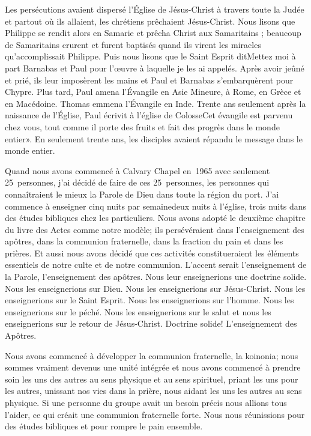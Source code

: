Les persécutions avaient dispersé l’Église de Jésus-Christ à travers toute la Judée et partout où ils allaient, les
chrétiens prêchaient Jésus-Christ. Nous lisons que Philippe se rendit alors en Samarie et prêcha Christ aux Samaritains
; beaucoup de Samaritains crurent et furent baptisés quand ils virent les miracles qu’accomplissait Philippe. Puis nous
lisons que le Saint Esprit dit\frcolon\og Mettez moi à part Barnabas et Paul pour l’œuvre à laquelle je les ai appelés.\fg{} Après
avoir jeûné et prié, ils leur imposèrent les mains et Paul et Barnabas s’embarquèrent pour Chypre. Plus tard, Paul
amena l’Évangile en Asie Mineure, à Rome, en Grèce et en Macédoine. Thomas emmena l’Évangile en Inde. Trente
ans seulement après la naissance de l’Église, Paul écrivit à l’église de Colosse\frcolon\og Cet évangile est parvenu chez vous,
tout comme il porte des fruits et fait des progrès dans le monde entier». En seulement trente ans, les disciples
avaient répandu le message dans le monde entier.

Quand nous avons commencé à Calvary Chapel en~1965 avec seulement 25~personnes, j’ai décidé de faire de ces 25~personnes,
 les personnes qui connaîtraient le mieux la Parole de Dieu dans toute la région du port. J’ai commence à
enseigner cinq nuits par semaine\frcolon deux nuits à l'église, trois nuits dans des études bibliques chez les particuliers. Nous
avons adopté le deuxième chapitre du livre des Actes comme notre modèle; \og ils persévéraient dans l’enseignement
des apôtres, dans la communion fraternelle, dans la fraction du pain et dans les prières.\fg{} Et aussi nous avons décidé
que ces activités constitueraient les éléments essentiels de notre culte et de notre communion. L’accent serait
l’enseignement de la Parole, \og l’enseignement des apôtres\fg{}. Nous leur enseignerions une doctrine solide. Nous les
enseignerions sur Dieu. Nous les enseignerions sur Jésus-Christ. Nous les enseignerions sur le Saint Esprit. Nous les
enseignerions sur l’homme. Nous les enseignerions sur le péché. Nous les enseignerions sur le salut et nous les
enseignerions sur le retour de Jésus-Christ. Doctrine solide! L’enseignement des Apôtres.

Nous avons commencé à développer la communion fraternelle, la \og koinonia\fg{}; nous sommes vraiment devenus une
\og unité intégrée\fg{} et nous avons commencé à prendre soin les uns des autres au sens physique et au sens spirituel,
priant les uns pour les autres, unissant nos vies dans la prière, nous aidant les uns les autres au sens physique. Si une
personne du groupe avait un besoin précis nous allions tous l’aider, ce qui créait une communion fraternelle forte.
Nous nous réunissions pour des études bibliques et pour rompre le pain ensemble.

